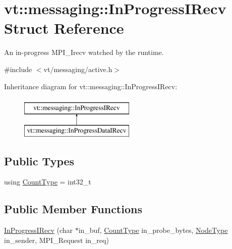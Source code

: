 \hypertarget{structvt_1_1messaging_1_1_in_progress_i_recv}{}\section{vt\+:\+:messaging\+:\+:In\+Progress\+I\+Recv Struct Reference}
\label{structvt_1_1messaging_1_1_in_progress_i_recv}


An in-\/progress M\+P\+I\+\_\+\+Irecv watched by the runtime.  




{\ttfamily \#include $<$vt/messaging/active.\+h$>$}

Inheritance diagram for vt\+:\+:messaging\+:\+:In\+Progress\+I\+Recv\+:\begin{figure}[H]
\begin{center}
\leavevmode
\includegraphics[height=2.000000cm]{structvt_1_1messaging_1_1_in_progress_i_recv}
\end{center}
\end{figure}
\subsection*{Public Types}
\begin{DoxyCompactItemize}
\item 
using \hyperlink{structvt_1_1messaging_1_1_in_progress_i_recv_a2a3824ca08dcfc5a3278882c1df8edd6}{Count\+Type} = int32\+\_\+t
\end{DoxyCompactItemize}
\subsection*{Public Member Functions}
\begin{DoxyCompactItemize}
\item 
\hyperlink{structvt_1_1messaging_1_1_in_progress_i_recv_ad9e4660352bfa1843c2757ef4795f0d5}{In\+Progress\+I\+Recv} (char $\ast$in\+\_\+buf, \hyperlink{structvt_1_1messaging_1_1_in_progress_i_recv_a2a3824ca08dcfc5a3278882c1df8edd6}{Count\+Type} in\+\_\+probe\+\_\+bytes, \hyperlink{namespacevt_a866da9d0efc19c0a1ce79e9e492f47e2}{Node\+Type} in\+\_\+sender, M\+P\+I\+\_\+\+Request in\+\_\+req)
\end{DoxyCompactItemize}
